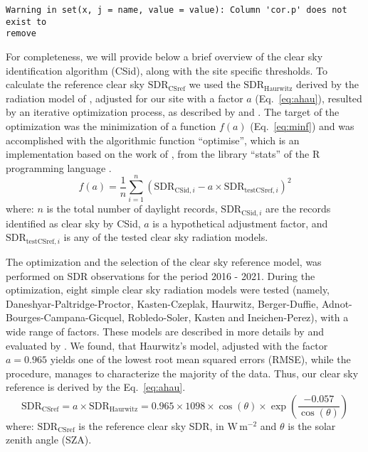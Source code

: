 \documentclass[applsci,article,submit,moreauthors,pdftex]{Definitions/mdpi}
\begin{document}
\begin{verbatim}
Warning in set(x, j = name, value = value): Column 'cor.p' does not exist to
remove
\end{verbatim}

For completeness, we will provide below a brief overview of the clear
sky identification algorithm (CSid), along with the site specific
thresholds. To calculate the reference clear sky
\(\text{SDR}_\text{CSref}\) we used the \(\text{SDR}_\text{Haurwitz}\)
derived by the radiation model of \citet{Haurwitz1945}, adjusted for our
site with a factor \(a\) (Eq.~\ref{eq:ahau}), resulted by an iterative
optimization process, as described by \citet{Long2000} and
\citet{Reno2016}. The target of the optimization was the minimization of
a function \(f(a)\) (Eq.~\ref{eq:minf}) and was accomplished with the
algorithmic function ``optimise'', which is an implementation based on
the work of \citet{Brent1973}, from the library ``stats'' of the R
programming language \citep{RCT2023}. \begin{equation}
f(a) = \frac{1}{n}\sum_{i=1}^{n} ( \text{SDR}_{\text{CSid},i} - a \times \text{SDR}_{\text{testCSref},i} )^2 \label{eq:minf}
\end{equation} where: \(n\) is the total number of daylight records,
\(\text{SDR}_{\text{CSid},i}\) are the records identified as clear sky
by CSid, \(a\) is a hypothetical adjustment factor, and
\(\text{SDR}_{\text{testCSref},i}\) is any of the tested clear sky
radiation models.

The optimization and the selection of the clear sky reference model, was
performed on SDR observations for the period 2016 - 2021. During the
optimization, eight simple clear sky radiation models were tested
(namely, Daneshyar-Paltridge-Proctor, Kasten-Czeplak, Haurwitz,
Berger-Duffie, Adnot-Bourges-Campana-Gicquel, Robledo-Soler, Kasten and
Ineichen-Perez), with a wide range of factors. These models are
described in more details by \citet{Reno2012} and evaluated by
\citet{Reno2016}. We found, that Haurwitz's model, adjusted with the
factor \(a = 0.965\) yields one of the lowest root mean squared errors
(RMSE), while the procedure, manages to characterize the majority of the
data. Thus, our clear sky reference is derived by the Eq.~\ref{eq:ahau}.
\begin{equation}
\text{SDR}_\text{CSref} = a \times \text{SDR}_\text{Haurwitz} = 0.965 \times 1098 \times \cos(\theta) \times \exp \left( \frac{ - 0.057}{\cos(\theta)} \right) \label{eq:ahau}
\end{equation} where: \(\text{SDR}_\text{CSref}\) is the reference clear
sky SDR, in \(\text{W}\,\text{m}^{-2}\) and \(\theta\) is the solar
zenith angle (SZA).
\end{document}
